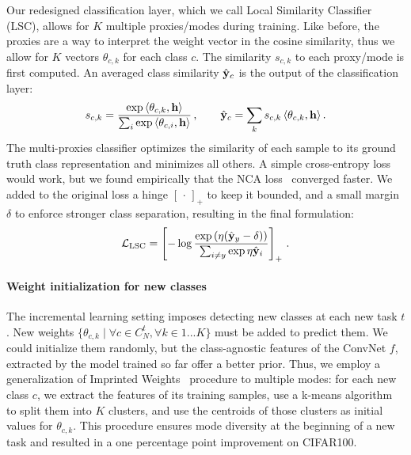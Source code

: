 Our redesigned classification layer, which we call Local Similarity Classifier (LSC), allows for $K$
multiple proxies/modes during training. Like before, the proxies are a way to interpret the weight
vector in the cosine similarity, thus we allow for $K$ vectors $\theta_{c,k}$ for each class $c$.
The similarity $s_{c,k}$ to each proxy/mode is first computed. An averaged class similarity $\hat{\mathbf{y}}_c$
is the output of the classification layer:
%
\begin{equation}
    s_{c,k} =\frac{\exp\,\langle\theta_{c,k},\mathbf{h}\rangle}{\sum_{i} \exp\,\langle\theta_{c,i},\mathbf{h}\rangle}\,, \qquad
    \hat{\mathbf{y}}_c = \sum_{k}s_{c,k}\,\langle\theta_{c,k},\mathbf{h}\rangle\,.
    \label{eq:podnet_lsc}
\end{equation}
%
The multi-proxies classifier optimizes the similarity of each sample to its ground truth class
representation and minimizes all others. A simple cross-entropy loss would work, but we found
empirically that the NCA loss~\citep{goldberger2005nca_loss,attias2017proxynca} converged faster. We
added to the original loss a hinge $[\,\cdot\,]_+$ to keep it bounded, and a small margin $\delta$
to enforce stronger class separation, resulting in the final formulation:
%
\begin{equation}
    \mathcal{L}_\text{LSC} = \left[- \log\frac{\exp\left(\eta (\hat{\mathbf{y}}_y - \delta)\right)}{\sum_{i \neq y} \exp \eta \hat{\mathbf{y}}_{i}} \right]_+ \,.
    \label{eq:podnet_nca}
\end{equation}

\paragraph{Weight initialization for new classes} The incremental learning setting imposes detecting
new classes at each new task $t$. New weights $\{\theta_{c,k} \mid \forall c \in C^t_N, \forall k
    \in {1...K}\}$ must be added to predict them. We could initialize them randomly, but the
class-agnostic features of the \ac{ConvNet} $f$, extracted by the model trained so far offer a
better prior. Thus, we employ a generalization of Imprinted Weights~\citep{qi2018imprintedweights}
procedure to multiple modes: for each new class $c$, we extract the features of its training
samples, use a k-means algorithm to split them into $K$ clusters, and use the centroids of those
clusters as initial values for $\theta_{c,k}$. This procedure ensures mode diversity at the
beginning of a new task and resulted in a one percentage point improvement on CIFAR100.


